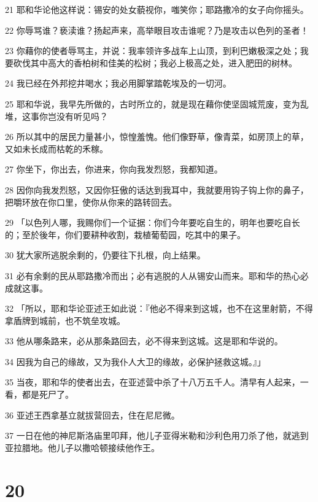 \par 21 耶和华论他这样说：锡安的处女藐视你，嗤笑你；耶路撒冷的女子向你摇头。
\par 22 你辱骂谁？亵渎谁？扬起声来，高举眼目攻击谁呢？乃是攻击以色列的圣者！
\par 23 你藉你的使者辱骂主，并说：我率领许多战车上山顶，到利巴嫩极深之处；我要砍伐其中高大的香柏树和佳美的松树；我必上极高之处，进入肥田的树林。
\par 24 我已经在外邦挖井喝水；我必用脚掌踏乾埃及的一切河。
\par 25 耶和华说，我早先所做的，古时所立的，就是现在藉你使坚固城荒废，变为乱堆，这事你岂没有听见吗？
\par 26 所以其中的居民力量甚小，惊惶羞愧。他们像野草，像青菜，如房顶上的草，又如未长成而枯乾的禾稼。
\par 27 你坐下，你出去，你进来，你向我发烈怒，我都知道。
\par 28 因你向我发烈怒，又因你狂傲的话达到我耳中，我就要用钩子钩上你的鼻子，把嚼环放在你口里，使你从你来的路转回去。
\par 29 「以色列人哪，我赐你们一个证据：你们今年要吃自生的，明年也要吃自长的；至於後年，你们要耕种收割，栽植葡萄园，吃其中的果子。
\par 30 犹大家所逃脱余剩的，仍要往下扎根，向上结果。
\par 31 必有余剩的民从耶路撒冷而出；必有逃脱的人从锡安山而来。耶和华的热心必成就这事。
\par 32 「所以，耶和华论亚述王如此说：『他必不得来到这城，也不在这里射箭，不得拿盾牌到城前，也不筑垒攻城。
\par 33 他从哪条路来，必从那条路回去，必不得来到这城。这是耶和华说的。
\par 34 因我为自己的缘故，又为我仆人大卫的缘故，必保护拯救这城。』」
\par 35 当夜，耶和华的使者出去，在亚述营中杀了十八万五千人。清早有人起来，一看，都是死尸了。
\par 36 亚述王西拿基立就拔营回去，住在尼尼微。
\par 37 一日在他的神尼斯洛庙里叩拜，他儿子亚得米勒和沙利色用刀杀了他，就逃到亚拉腊地。他儿子以撒哈顿接续他作王。

\chapter{20}

